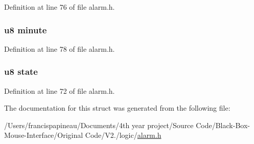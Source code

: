 \-Definition at line 76 of file alarm.\-h.

\hypertarget{structalarm_ae0a353dafc35c2935794f93a4e473a19}{
\subsubsection[{minute}]{\setlength{\rightskip}{0pt plus 5cm}u8 {\bf minute}}}\label{structalarm_ae0a353dafc35c2935794f93a4e473a19}


\-Definition at line 78 of file alarm.\-h.

\hypertarget{structalarm_ad0bc4e4e6e6ffc52d9079b73afd73887}{
\subsubsection[{state}]{\setlength{\rightskip}{0pt plus 5cm}u8 {\bf state}}}\label{structalarm_ad0bc4e4e6e6ffc52d9079b73afd73887}


\-Definition at line 72 of file alarm.\-h.



\-The documentation for this struct was generated from the following file\-:\begin{DoxyCompactItemize}
\item 
/\-Users/francispapineau/\-Documents/4th year project/\-Source Code/\-Black-\/\-Box-\/\-Mouse-\/\-Interface/\-Original Code/\-V2./logic/\hyperlink{alarm_8h}{alarm.\-h}\end{DoxyCompactItemize}
